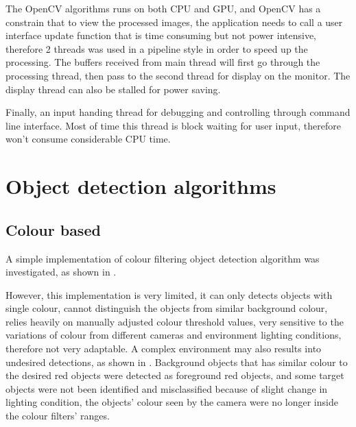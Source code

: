 The OpenCV algorithms runs on both CPU and GPU, and OpenCV has a constrain that to view the processed images, the application needs to call a user interface update function that is time consuming but not power intensive, therefore 2 threads was used in a pipeline style in order to speed up the processing. The buffers received from main thread will first go through the processing thread, then pass to the second thread for display on the monitor. The display thread can also be stalled for power saving.


Finally, an input handing thread for debugging and controlling through command line interface. Most of time this thread is block waiting for user input, therefore won't consume considerable CPU time.

\section{Object detection algorithms}

\subsection{Colour based}

A simple implementation of colour filtering object detection algorithm \cite{MOTBOC.git} was investigated, as shown in .

However, this implementation is very limited, it can only detects objects with single colour, cannot distinguish the objects from similar background colour, relies heavily on manually adjusted colour threshold values, very sensitive to the variations of colour from different cameras and environment lighting conditions, therefore not very adaptable. A complex environment may also results into undesired detections, as shown in . Background objects that has similar colour to the desired red objects were detected as foreground red objects, and some target objects were not been identified and misclassified because of slight change in lighting condition, the objects' colour seen by the camera were no longer inside the colour filters' ranges.

